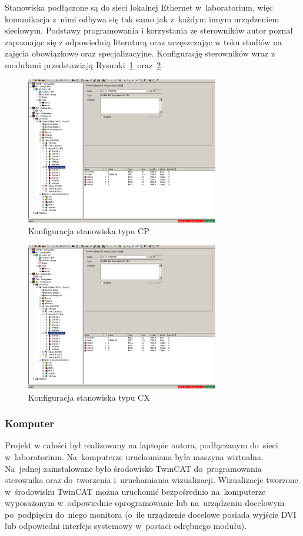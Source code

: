 \indent
\indent Stanowiska podłączone są do sieci lokalnej Ethernet w~laboratorium, więc komunikacja z~nimi odbywa się tak samo jak z~każdym innym urządzeniem sieciowym. Podstawy programowania i korzystania ze sterowników autor poznał zapoznając się z odpowiednią literaturą \cite{plc1,plc2,plc4,plc5,plc6} oraz uczęszczając w toku studiów na zajęcia obowiązkowe oraz specjalizacyjne.
Konfigurację sterowników wraz z modułami przedstawiają Rysunki~\ref{conf:cp}~oraz~\ref{conf:cx}.
\begin{figure}[!htb] 	\centering 	\includegraphics[width=0.75\textwidth]{images/confCP} \caption{Konfiguracja stanowiska typu CP} \label{conf:cp} \end{figure}
\begin{figure}[!htb] 	\centering 	\includegraphics[width=0.75\textwidth]{images/confCX} \caption{Konfiguracja stanowiska typu CX} \label{conf:cx} \end{figure}

\subsubsection{Komputer}
Projekt w całości był realizowany na laptopie autora, podłączanym do~sieci w~laboratorium. Na~komputerze uruchomiana była maszyna wirtualna. Na~jednej zainstalowane było środowisko TwinCAT do~programowania sterownika oraz do~tworzenia i~uruchamiania wizualizacji. Wizualizacje tworzone w~środowisku TwinCAT można uruchomić bezpośrednio na~komputerze wyposażonym w~odpowiednie oprogramowanie lub na~urządzeniu docelowym po~podpięciu do~niego monitora (o~ile urządzenie docelowe posiada wyjście DVI lub odpowiedni interfejs systemowy w~postaci odrębnego modułu).

